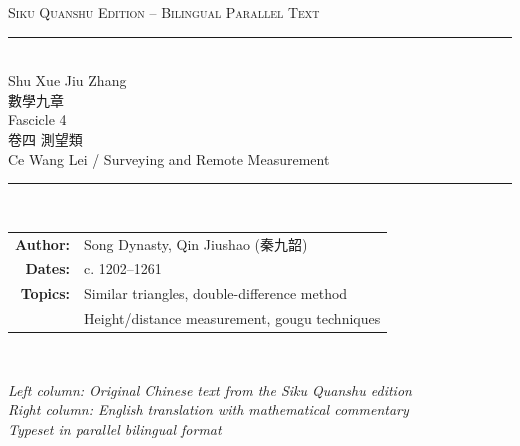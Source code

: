 \documentclass[11pt,a4paper]{article}
\begin{document}
\begin{titlepage}
\centering
\vspace*{2cm}

{\fontsize{13}{15}\selectfont\textsc{Siku Quanshu Edition -- Bilingual Parallel Text}}\\[0.3cm]
{\color{rulecolor}\rule{7cm}{0.5pt}}\\[0.8cm]

{\fontsize{26}{30}\selectfont\textcolor{titlecolor}{Shu Xue Jiu Zhang}}\\[0.5cm]
{\fontsize{20}{24}\selectfont\textcolor{sectioncolor}{數學九章}}\\[0.8cm]
{\fontsize{16}{20}\selectfont\textcolor{subsectioncolor}{Fascicle 4}}\\[0.2cm]
{\fontsize{20}{24}\selectfont\textcolor{sectioncolor}{卷四 測望類}}\\[0.5cm]
{\fontsize{14}{18}\selectfont\textcolor{subsectioncolor}{Ce Wang Lei / Surveying and Remote Measurement}}\\[1.2cm]

{\color{rulecolor}\rule{7cm}{0.5pt}}\\[0.8cm]

{\large
\begin{tabular}{rl}
\textbf{Author:} & Song Dynasty, Qin Jiushao (秦九韶) \\[0.4em]
\textbf{Dates:} & c. 1202--1261 \\[0.4em]
\textbf{Topics:} & Similar triangles, double-difference method \\[0.2em]
               & Height/distance measurement, gougu techniques \\
\end{tabular}
}\\[1.5cm]


\vfill
{\small\textit{Left column: Original Chinese text from the Siku Quanshu edition}}\\
{\small\textit{Right column: English translation with mathematical commentary}}\\[0.5cm]
{\small\textit{Typeset in parallel bilingual format}}

\end{titlepage}
\end{document}

